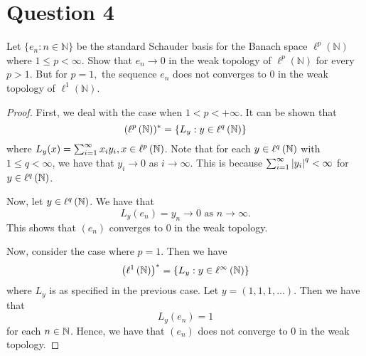 \section{Question 4}
\horz
Let $\{ e_n:n\in\mathbb N\}$ be the standard Schauder basis for the Banach space $\ell^p(\mathbb N)$ where $1 \leqslant p < \infty.$  Show that $e_n \to 0$ in the weak topology of $\ell^p(\mathbb N)$ for every $p >1.$ But for $p=1,$ the sequence $e_n$ does not converges to $0$ in the weak topology of $\ell^1(\mathbb N).$
\horz
\begin{proof}
    First, we deal with the case when $1<p < +\infty$. It can be shown that
    \begin{equation*}
	(\ell ^{p} \left( \mathbb N \right))^{*} = \left\{ L_{y} : y \in \ell ^{q} \left( \mathbb N \right) \right\}
    \end{equation*}
    where $L_{y}(x)=\sum_{i=1}^{\infty} x_{i}y_{i}, x\in \ell ^{p} \left( \mathbb N \right)$. Note that for each $y\in \ell ^{q} \left( \mathbb N \right)$ with $1 \le q < \infty$, we have that $y_{i} \to 0$ as $i \to \infty$. This is because $\sum_{i=1}^{\infty} \left\lvert y_{i} \right\rvert^{q} < \infty$ for $y \in\ell^{q} \left( \mathbb N \right)$. 

    Now, let $y\in \ell ^{q} \left( \mathbb N \right)$. We have that 
    \begin{equation*}
	L_{y} \left( e_{n} \right) = y_{n} \to 0 \text{ as } n \to \infty.
    \end{equation*}
    This shows that $\left( e_{n} \right) $ converges to $0$ in the weak topology.

    Now, consider the case where $p=1$. Then we have
    \begin{equation*}
	\left( \ell ^{1} \left( \mathbb N \right) \right)^{*} = \left\{ L_{y} : y \in \ell ^{\infty} \left( \mathbb N \right) \right\}
    \end{equation*}
    where $L_{y}$ is as specified in the previous case. Let $y=\left( 1,1,1,\ldots \right)$. Then we have that
    \begin{equation*}
	L_{y} \left( e_{n} \right) = 1
    \end{equation*}
    for each $n \in \mathbb N$. Hence, we have that $(e_{n})$ does not converge to $0$ in the weak topology.
\end{proof}
